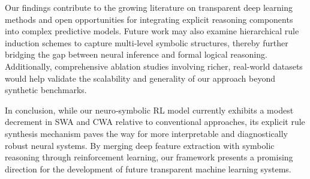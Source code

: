 \documentclass{article}
\begin{document}
Our findings contribute to the growing literature on transparent deep learning methods and open opportunities for integrating explicit reasoning components into complex predictive models. Future work may also examine hierarchical rule induction schemes to capture multi-level symbolic structures, thereby further bridging the gap between neural inference and formal logical reasoning. Additionally, comprehensive ablation studies involving richer, real-world datasets would help validate the scalability and generality of our approach beyond synthetic benchmarks.

In conclusion, while our neuro‐symbolic RL model currently exhibits a modest decrement in SWA and CWA relative to conventional approaches, its explicit rule synthesis mechanism paves the way for more interpretable and diagnostically robust neural systems. By merging deep feature extraction with symbolic reasoning through reinforcement learning, our framework presents a promising direction for the development of future transparent machine learning systems.
\end{document}
